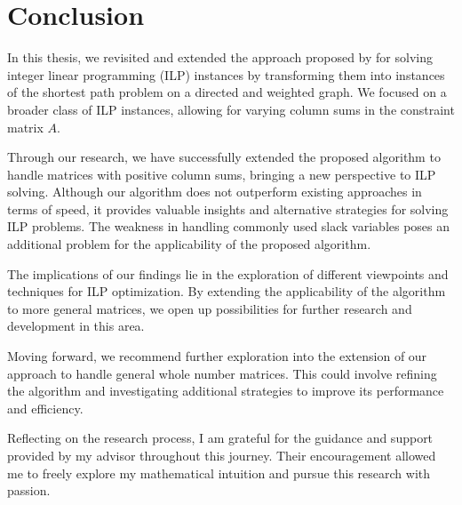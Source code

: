 \chapter{Conclusion}
In this thesis, we revisited and extended the approach proposed by \cite{algebraic_statistics} for solving integer linear programming (ILP) instances by transforming them into instances of the shortest path problem on a directed and weighted graph. We focused on a broader class of ILP instances, allowing for varying column sums in the constraint matrix $A$.

Through our research, we have successfully extended the proposed algorithm to handle matrices with positive column sums, bringing a new perspective to ILP solving. Although our algorithm does not outperform existing approaches in terms of speed, it provides valuable insights and alternative strategies for solving ILP problems. The weakness in handling commonly used slack variables poses an additional problem for the applicability of the proposed algorithm.

The implications of our findings lie in the exploration of different viewpoints and techniques for ILP optimization. By extending the applicability of the algorithm to more general matrices, we open up possibilities for further research and development in this area.

Moving forward, we recommend further exploration into the extension of our approach to handle general whole number matrices. This could involve refining the algorithm and investigating additional strategies to improve its performance and efficiency.

Reflecting on the research process, I am grateful for the guidance and support provided by my advisor throughout this journey. Their encouragement allowed me to freely explore my mathematical intuition and pursue this research with passion.


